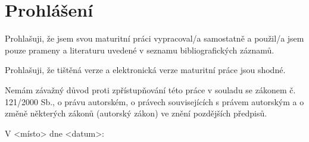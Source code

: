 \section*{Prohlášení}

Prohlašuji, že jsem svou maturitní práci vypracoval/a samostatně a použil/a jsem pouze prameny a literaturu uvedené v seznamu bibliografických záznamů.

Prohlašuji, že tištěná verze a elektronická verze maturitní práce jsou shodné.

Nemám závažný důvod proti zpřístupňování této práce v souladu se zákonem č. 121/2000 Sb., o právu autorském, o právech souvisejících s právem autorským a o změně některých zákonů (autorský zákon) ve znění pozdějších předpisů.

V <místo> dne <datum>: \hrulefill
